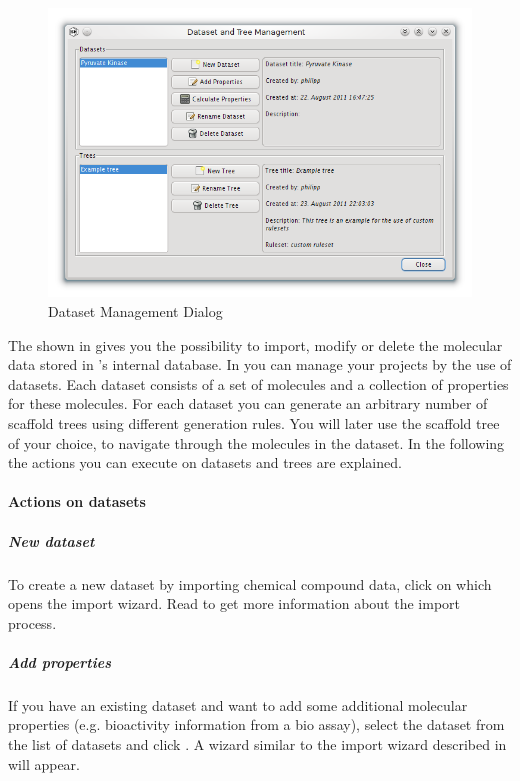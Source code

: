 \begin{figure}[ht]
   \centering
   \includegraphics[width=\textwidth]{images/sh_dataset_management_dialog.png}
   \caption{Dataset Management Dialog}
   \label{fig:dataset_management}
\end{figure}

The  shown in  gives you the possibility to import, modify or delete the molecular data stored in \sh's internal database.
In \sh you can manage your projects by the use of datasets.
Each dataset consists of a set of molecules and a collection of properties for these molecules.
For each dataset you can generate an arbitrary number of scaffold trees using different generation rules.
You will later use the scaffold tree of your choice, to navigate through the molecules in the dataset.
In the following the actions you can execute on datasets and trees are explained.

\paragraph*{Actions on datasets}

\subparagraph*{New dataset}
To create a new dataset by importing chemical compound data, click on  which opens the import wizard.
Read  to get more information about the import process.

\subparagraph*{Add properties}
If you have an existing dataset and want to add some additional molecular properties (e.g. bioactivity information from a bio assay),
select the dataset from the list of datasets and click .
A wizard similar to the import wizard described in  will appear.

